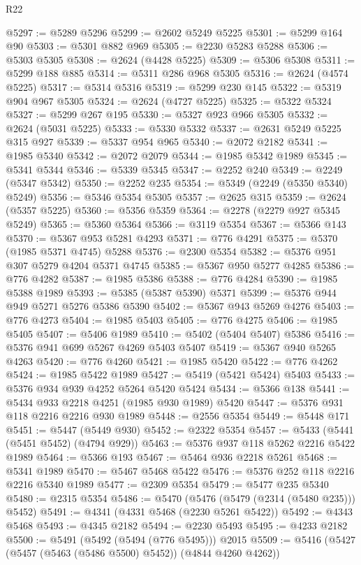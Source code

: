 \begin{lexlean}{R22}
\begin{coremodule}
@5297 := @5289 @5296
@5299 := @2602 @5249 @5225
@5301 := @5299 @164 @90
@5303 := @5301 @882 @969
@5305 := @2230 @5283 @5288
@5306 := @5303 @5305
@5308 := @2624 (@4428 @5225)
@5309 := @5306 @5308
@5311 := @5299 @188 @885
@5314 := @5311 @286 @968 @5305
@5316 := @2624 (@4574 @5225)
@5317 := @5314 @5316
@5319 := @5299 @230 @145
@5322 := @5319 @904 @967 @5305
@5324 := @2624 (@4727 @5225)
@5325 := @5322 @5324
@5327 := @5299 @267 @195
@5330 := @5327 @923 @966 @5305
@5332 := @2624 (@5031 @5225)
@5333 := @5330 @5332
@5337 := @2631 @5249 @5225 @315 @927
@5339 := @5337 @954 @965
@5340 := @2072 @2182
@5341 := @1985 @5340
@5342 := @2072 @2079
@5344 := @1985 @5342 @1989
@5345 := @5341 @5344
@5346 := @5339 @5345
@5347 := @2252 @240
@5349 := @2249 (@5347 @5342)
@5350 := @2252 @235
@5354 := @5349 (@2249 (@5350 @5340) @5249)
@5356 := @5346 @5354 @5305
@5357 := @2625 @315
@5359 := @2624 (@5357 @5225)
@5360 := @5356 @5359
@5364 := @2278 (@2279 @927 @5345 @5249)
@5365 := @5360 @5364
@5366 := @3119 @5354
@5367 := @5366 @143
@5370 := @5367 @953 @5281 @4293
@5371 := @776 @4291
@5375 := @5370 (@1985 @5371 @4745) @5288
@5376 := @2300 @5354
@5382 := @5376 @951 @307 @5279 @4204 @5371 @4745
@5385 := @5367 @950 @5277 @4285
@5386 := @776 @4282
@5387 := @1985 @5386
@5388 := @776 @4284
@5390 := @1985 @5388 @1989
@5393 := @5385 (@5387 @5390) @5371
@5399 := @5376 @944 @949 @5271 @5276 @5386 @5390
@5402 := @5367 @943 @5269 @4276
@5403 := @776 @4273
@5404 := @1985 @5403
@5405 := @776 @4275
@5406 := @1985 @5405
@5407 := @5406 @1989
@5410 := @5402 (@5404 @5407) @5386
@5416 := @5376 @941 @699 @5267 @4269 @5403 @5407
@5419 := @5367 @940 @5265 @4263
@5420 := @776 @4260
@5421 := @1985 @5420
@5422 := @776 @4262
@5424 := @1985 @5422 @1989
@5427 := @5419 (@5421 @5424) @5403
@5433 := @5376 @934 @939 @4252 @5264 @5420 @5424
@5434 := @5366 @138
@5441 := @5434 @933 @2218 @4251 (@1985 @930 @1989) @5420
@5447 := @5376 @931 @118 @2216 @2216 @930 @1989
@5448 := @2556 @5354
@5449 := @5448 @171
@5451 := @5447 (@5449 @930)
@5452 := @2322 @5354
@5457 := @5433 (@5441 (@5451 @5452) (@4794 @929))
@5463 := @5376 @937 @118 @5262 @2216 @5422 @1989
@5464 := @5366 @193
@5467 := @5464 @936 @2218 @5261
@5468 := @5341 @1989
@5470 := @5467 @5468 @5422
@5476 := @5376 @252 @118 @2216 @2216 @5340 @1989
@5477 := @2309 @5354
@5479 := @5477 @235 @5340
@5480 := @2315 @5354
@5486 := @5470 (@5476 (@5479 (@2314 (@5480 @235))) @5452)
@5491 := @4341 (@4331 @5468 (@2230 @5261 @5422))
@5492 := @4343 @5468
@5493 := @4345 @2182
@5494 := @2230 @5493
@5495 := @4233 @2182
@5500 := @5491 (@5492 (@5494 (@776 @5495))) @2015
@5509 := @5416 (@5427 (@5457 (@5463 (@5486 @5500) @5452)) (@4844 @4260 @4262))

\end{coremodule}
\end{lexlean}

